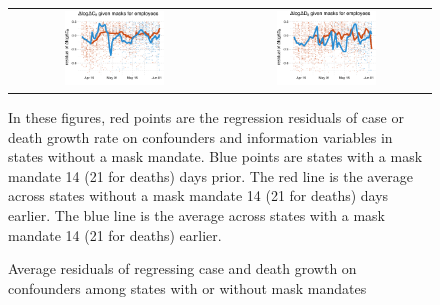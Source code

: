 \documentclass[11pt]{article}
\begin{document}
\begin{enumerate}
\begin{figure}[ht]
  \caption{Average  residuals of regressing case and death growth on confounders among states with or without  mask mandates \label{fig:masks-res}}\vspace{0.2cm}
 \begin{minipage}{\linewidth}
    \centering
    \begin{tabular}{cc}
      \includegraphics[width=0.5\textwidth]{tables_and_figures/pmaskbus-cases-res-14}
      &
        \includegraphics[width=0.5\textwidth]{tables_and_figures/pmaskbus-deaths-res-21}
    \end{tabular}
    \begin{flushleft}
      \scriptsize In these figures, red points are the regression residuals of case or death
      growth rate on confounders and information variables in states without a mask mandate. Blue points are
      states with a mask mandate 14 (21 for deaths) days prior. The
      red line is the average across states without a mask mandate 14
      (21 for deaths) days earlier. The blue line is the average
      across states with a mask mandate 14 (21 for deaths) earlier.
    \end{flushleft}
  \end{minipage}
\end{figure}



\end{enumerate}
\end{document}
